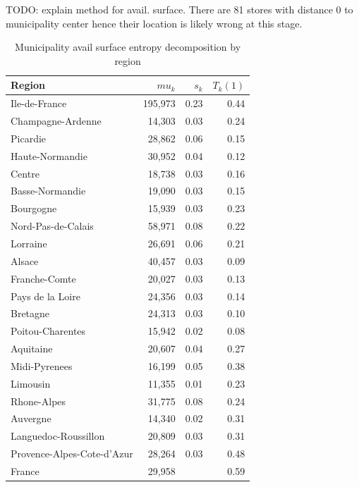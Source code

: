 \documentclass[11pt]{article}
\begin{document}
TODO: explain method for avail. surface. There are 81 stores with distance 0 to municipality center hence their location is likely wrong at this stage.

\begin{table}[H]
\caption{Municipality avail surface entropy decomposition by region}
\footnotesize

\begin{tabular}{lrrr}
\toprule
\toprule
Region                     & $mu_k$     &      $s_k$ &   $T_k(1)$ \\
\midrule
Ile-de-France              &    195,973 &       0.23 &       0.44 \\
Champagne-Ardenne          &     14,303 &       0.03 &       0.24 \\
Picardie                   &     28,862 &       0.06 &       0.15 \\
Haute-Normandie            &     30,952 &       0.04 &       0.12 \\
Centre                     &     18,738 &       0.03 &       0.16 \\
Basse-Normandie            &     19,090 &       0.03 &       0.15 \\
Bourgogne                  &     15,939 &       0.03 &       0.23 \\
Nord-Pas-de-Calais         &     58,971 &       0.08 &       0.22 \\
Lorraine                   &     26,691 &       0.06 &       0.21 \\
Alsace                     &     40,457 &       0.03 &       0.09 \\
Franche-Comte              &     20,027 &       0.03 &       0.13 \\
Pays de la Loire           &     24,356 &       0.03 &       0.14 \\
Bretagne                   &     24,313 &       0.03 &       0.10 \\
Poitou-Charentes           &     15,942 &       0.02 &       0.08 \\
Aquitaine                  &     20,607 &       0.04 &       0.27 \\
Midi-Pyrenees              &     16,199 &       0.05 &       0.38 \\
Limousin                   &     11,355 &       0.01 &       0.23 \\
Rhone-Alpes                &     31,775 &       0.08 &       0.24 \\
Auvergne                   &     14,340 &       0.02 &       0.31 \\
Languedoc-Roussillon       &     20,809 &       0.03 &       0.31 \\
Provence-Alpes-Cote-d'Azur &     28,264 &       0.03 &       0.48 \\
\midrule
France                     &     29,958 &            &       0.59 \\
\bottomrule
\end{tabular}

\end{table}
\end{document}
